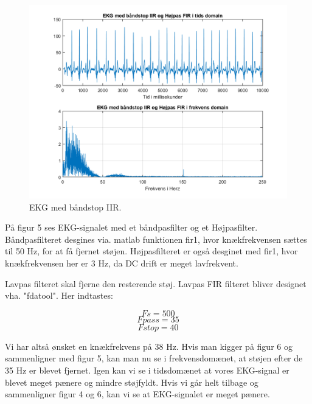 \documentclass[12pt, letterpaper]{article}
\begin{document}
\begin{figure}[H]
           \includegraphics[width=\linewidth]{billeder/bandstopIIRogHojpasFIR}	   							\caption{EKG med båndstop IIR.}
\end{figure}

På figur 5 ses EKG-signalet med et båndpasfilter og et Højpasfilter. 
Båndpasfilteret desgines via. matlab funktionen fir1, hvor knækfrekvensen sættes til 50 Hz, for at få fjernet støjen. 
Højpasfilteret er også desginet med fir1, hvor knækfrekvensen her er 3 Hz, da DC drift er meget lavfrekvent. 

Lavpas filteret skal fjerne den resterende støj. Lavpas FIR filteret bliver designet vha. "fdatool". Her indtastes: 

$$ Fs = 500 $$
$$ Fpass = 35 $$
$$ Fstop = 40 $$

Vi har altså ønsket en knækfrekvens på 38 Hz. 
Hvis man kigger på figur 6 og sammenligner med figur 5, kan man nu se i frekvensdomænet, at støjen efter de 35 Hz er blevet fjernet.
Igen kan vi se i tidsdomænet at vores EKG-signal er blevet meget pænere og mindre støjfyldt. Hvis vi går helt tilbage og sammenligner figur 4 og 6, kan vi se at EKG-signalet er meget pænere. 
\end{document}

